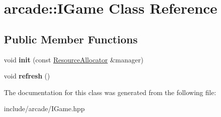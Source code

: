 \hypertarget{classarcade_1_1_i_game}{}\section{arcade\+::I\+Game Class Reference}
\label{classarcade_1_1_i_game}
\subsection*{Public Member Functions}
\begin{DoxyCompactItemize}
\item 
\mbox{\label{classarcade_1_1_i_game_ae3faad1a4fcc02c7fb4247bc875c8105}} 
void {\bfseries init} (const \mbox{\hyperlink{classarcade_1_1_resource_allocator}{Resource\+Allocator}} \&manager)
\item 
\mbox{\label{classarcade_1_1_i_game_af840cacc162a0cefdb4e0d832122f524}} 
void {\bfseries refresh} ()
\end{DoxyCompactItemize}


The documentation for this class was generated from the following file\+:\begin{DoxyCompactItemize}
\item 
include/arcade/I\+Game.\+hpp\end{DoxyCompactItemize}
